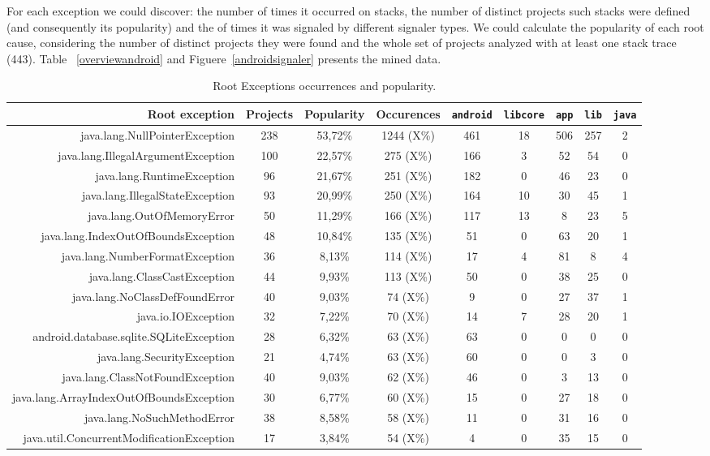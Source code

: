 \documentclass[conference]{IEEEtran}
\begin{document}
For each exception we could discover: the number of times it occurred on stacks, the number of distinct projects such stacks were defined (and consequently its popularity) and the of times it was signaled by different signaler types. We could calculate the popularity of each root cause, considering the number of distinct projects they were found and the whole set of projects analyzed with at least one stack trace (443). Table ~\ref{overviewandroid} and Figuere~\ref{androidsignaler} presents the mined data.

\begin{table}
  \centering
  \begin{tabular}{rcccccccc}
    \hline
    \bfseries{Root exception} & \bfseries{Projects} & \bfseries{Popularity} & \bfseries{Occurences}	& \texttt{android} & \texttt{libcore} & \texttt{app} & \texttt{lib} & \texttt{java} \\
    \hline
    java.lang.NullPointerException	& 238	& 53,72\%	& 1244 (X\%)	& 461	& 18	& 506	& 257	& 2 \\
    java.lang.IllegalArgumentException & 100 & 22,57\% & 275  (X\%) & 166 & 3 & 52 & 54 & 0 \\
    java.lang.RuntimeException & 96 & 21,67\% & 251 (X\%) & 182 & 0 & 46 & 23 & 0 \\
    java.lang.IllegalStateException & 93 & 20,99\% & 250 (X\%) & 164 & 10 & 30 & 45 & 1 \\
    java.lang.OutOfMemoryError & 50 & 11,29\% & 166 (X\%) & 117 & 13 & 8 & 23 & 5 \\
    java.lang.IndexOutOfBoundsException & 48 & 10,84\% & 135 (X\%) & 51 & 0 & 63 & 20 & 1 \\ 
    java.lang.NumberFormatException & 36 & 8,13\% & 114 (X\%) & 17 & 4 & 81 & 8 & 4 \\
    java.lang.ClassCastException & 44 & 9,93\% & 113 (X\%) & 50 & 0 & 38 & 25 & 0 \\
    java.lang.NoClassDefFoundError & 40 & 9,03\% & 74 (X\%) & 9 & 0 & 27 & 37 & 1\\
    java.io.IOException & 32 & 7,22\% & 70 (X\%) & 14 & 7 & 28 & 20 & 1\\
    android.database.sqlite.SQLiteException & 28 & 6,32\% & 63 (X\%) & 63 & 0 & 0 & 0 & 0\\
    java.lang.SecurityException & 21 & 4,74\% & 63 (X\%) & 60 & 0 & 0 & 3 & 0\\
    java.lang.ClassNotFoundException & 40 & 9,03\% & 62 (X\%) & 46 & 0 & 3 & 13 & 0\\
    java.lang.ArrayIndexOutOfBoundsException & 30 & 6,77\% & 60 (X\%) & 15 & 0 & 27 & 18 & 0\\
    java.lang.NoSuchMethodError & 38 & 8,58\% & 58 (X\%) & 11 & 0 & 31 & 16 &
    0\\
    java.util.ConcurrentModificationException & 17 & 3,84\% & 54 (X\%) & 4 & 0 & 35 & 15 & 0\\
    \hline
  \end{tabular}
\caption{Root Exceptions occurrences and popularity.}
\label{tab:overviewandroid}
\end{table}
\end{document}

